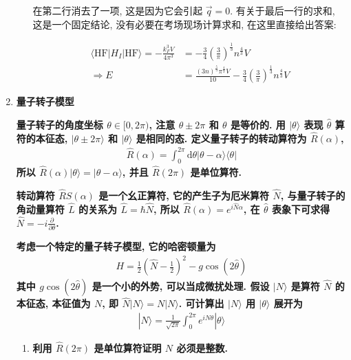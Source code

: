 \documentclass[../../main.tex]{subfiles}
\begin{document}
\begin{enumerate}
\begin{enumerate}
    在第二行消去了一项, 这是因为它会引起 $\vec{q} = 0$. 有关于最后一行的求和, 这是一个固定结论, 没有必要在考场现场计算求和, 在这里直接给出答案:

    \begin{align*}
      \langle\text{HF}|H_{I}|\text{HF}\rangle = -\frac{k_{F}^{3}V}{4\pi^{3}} &= -\frac{3}{4}\left(\frac{3}{\pi}\right)^{\frac{1}{3}}n^{\frac{4}{3}}V\\
      \Rightarrow E &= \frac{(3n)^{\frac{5}{3}}\pi^{\frac{4}{3}}V}{10} - \frac{3}{4}\left(\frac{3}{\pi}\right)^{\frac{1}{3}}n^{\frac{4}{3}}V
    \end{align*}
  \end{enumerate}

  \item \textbf{量子转子模型}
  
  \textbf{量子转子的角度坐标 $\theta\in[0,2\pi)$, 注意 $\theta\pm 2\pi$ 和 $\theta$ 是等价的. 用 $|\theta\rangle$ 表现 $\hat{\theta}$ 算符的本征态, $|\theta\pm 2\pi\rangle$ 和 $|\theta\rangle$ 是相同的态. 定义量子转子的转动算符为 $\hat{R}(\alpha)$, 
  \begin{align*}
    \hat{R}(\alpha) = \int_{0}^{2\pi}\mathrm{d}\theta |\theta - \alpha\rangle\langle\theta|
  \end{align*}
  所以 $\hat{R}(\alpha)|\theta\rangle = |\theta - \alpha\rangle$, 并且 $\hat{R}(2\pi)$ 是单位算符.}

  \textbf{转动算符 $\hat{R}S(\alpha)$ 是一个幺正算符, 它的产生子为厄米算符 $\hat{N}$, 与量子转子的角动量算符 $\hat{L}$ 的关系为 $\hat{L} = \hbar\hat{N}$, 所以 $\hat{R}(\alpha) = e^{i\hat{N}\alpha}$, 在 $\hat{\theta}$ 表象下可求得 $\hat{N} = -i\frac{\partial}{\partial\theta}$. }

  \textbf{考虑一个特定的量子转子模型, 它的哈密顿量为
  \begin{align*}
    H = \frac{1}{2}\left(\hat{N} - \frac{1}{2}\right)^{2} - g\cos{\left(2\hat{\theta}\right)}
  \end{align*}
  其中 $g\cos{\left(2\hat{\theta}\right)}$ 是一个小的外势, 可以当成微扰处理. 假设 $|N\rangle$ 是算符 $\hat{N}$ 的本征态, 本征值为 $N$, 即 $\hat{N}|N\rangle = N|N\rangle$. 可计算出 $|N\rangle$ 用 $|\theta\rangle$ 展开为
  \begin{align*}
    |N\rangle = \frac{1}{\sqrt{2\pi}}\int_{0}^{2\pi}e^{iN\theta}|\theta\rangle
  \end{align*}}
  \begin{enumerate}
    \item \textbf{利用 $\hat{R}(2\pi)$ 是单位算符证明 $N$ 必须是整数.}
    

\end{enumerate}
\end{enumerate}
\end{document}
